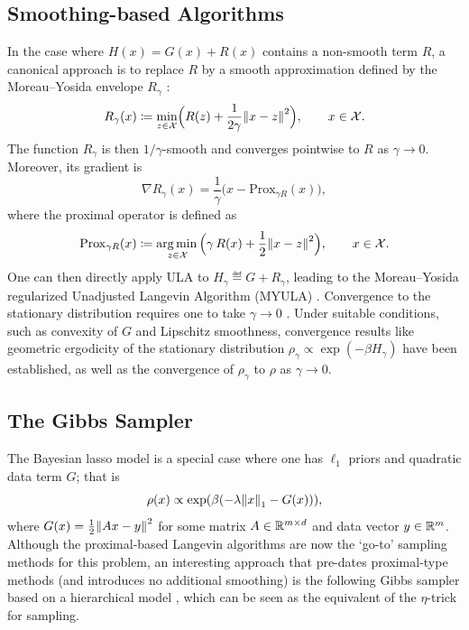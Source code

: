 \documentclass[11pt, twoside]{report}
\begin{document}
\subsection{Smoothing-based Algorithms}
In the case where $H(x) = G(x) + R(x)$ contains a non-smooth term $R$, a canonical approach is to replace $R$ by a smooth approximation defined by the Moreau--Yosida envelope $R_\gamma$ \cite{pereyra2016proximal}:
$$
R_\gamma(x)\eqdef \min_{z\in \mathcal X} \Bigl(R(z) + \frac{1}{2\gamma}\norm{x-z}^2\Bigr),\qquad x\in \mathcal X.
$$
The function $R_\gamma$ is then $1/\gamma$-smooth and converges pointwise to $R$ as $\gamma \to 0$. 
Moreover, its gradient is
$$
\nabla R_\gamma(x) = \frac{1}{\gamma}\bigl( x - \mathrm{Prox}_{\gamma R}(x)\bigr),
$$
where the proximal operator is defined as
\begin{align*}
    \mathrm{Prox}_{\gamma R}(x) \eqdef \argmin_{z\in \mathcal X} \Bigl(\gamma\, R(x) + \frac12 \norm{x-z}^2\Bigr),\qquad x\in \mathcal X.
\end{align*}
One can then directly apply ULA to $H_\gamma\eqdef G + R_\gamma$, leading to the Moreau--Yosida regularized Unadjusted Langevin Algorithm (MYULA) \cite{durmus2018efficient}. Convergence to the stationary distribution requires one to take $\gamma \to 0$ \cite{durmus2018efficient}. Under suitable conditions, such as convexity of $G$ and Lipschitz smoothness, convergence results like geometric ergodicity of the stationary distribution   $\rho_\gamma \propto \exp(-\beta H_\gamma)$ have been established, as well as the convergence of $\rho_\gamma$ to $\rho$ as $\gamma \to 0$.
\subsection{The Gibbs Sampler}
The Bayesian lasso model is a special case where one has $\ell_1$ priors and quadratic data term $G$; that is
$$
\rho(x) \propto \exp\pa{ \beta \pa{-\lambda \norm{x}_1 - G(x)} },
$$
where $G(x) = \frac12\norm{Ax-y}^2$
for some matrix $A\in \mathbb{R}^{m\times d}$ and data vector $y\in \mathbb{R}^m$. 
Although the proximal-based Langevin algorithms are now the `go-to' sampling methods for this problem,  an interesting approach that  pre-dates  proximal-type methods (and introduces no additional smoothing) is the following Gibbs sampler based on a hierarchical model \cite{park2008Bayesian}, which can be seen as the equivalent of the $\eta$-trick for sampling.

\end{document}

